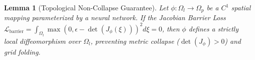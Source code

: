 \newtheorem{lemma}{Lemma}
\begin{lemma}[Topological Non-Collapse Guarantee]
Let $\phi: \Omega_l \to \Omega_p$ be a $C^1$ spatial mapping parameterized by a neural network. If the Jacobian Barrier Loss $\mathcal{L}_{\text{barrier}} = \int_{\Omega_l} \max(0, \epsilon - \det(J_{\phi}(\xi)))^2 d\xi = 0$, then $\phi$ defines a strictly local diffeomorphism over $\Omega_l$, preventing metric collapse ($\det(J_\phi) > 0$) and grid folding.
\end{lemma}
